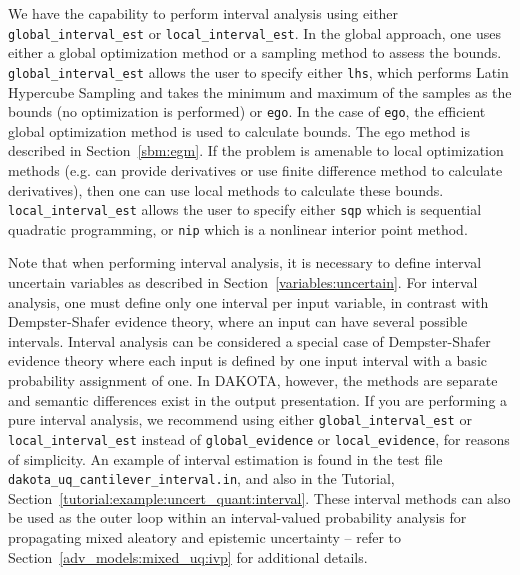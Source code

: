 We have the capability to perform interval analysis using either
\texttt{global\_interval\_est} or \texttt{local\_interval\_est}.
In the global approach, one uses either a global optimization 
method or a sampling method to assess the bounds. 
\texttt{global\_interval\_est}
allows the user to specify either \texttt{lhs}, which performs 
Latin Hypercube Sampling and takes the minimum and maximum of 
the samples as the bounds (no optimization is 
performed) or \texttt{ego}.  In the case of \texttt{ego}, 
the efficient global optimization method is used to calculate 
bounds.  The ego method is described in Section~\ref{sbm:egm}.
If the problem is amenable to local optimization 
methods (e.g. can provide derivatives or use finite difference 
method to calculate derivatives), then one can use local
methods to calculate these bounds.  \texttt{local\_interval\_est}
allows the user to specify either \texttt{sqp} which is sequential 
quadratic programming, or \texttt{nip} which is a nonlinear interior point 
method. 

Note that when performing interval analysis, it is necessary to define
interval uncertain variables as described in
Section~\ref{variables:uncertain}.  For interval analysis, one must
define only one interval per input variable, in contrast with
Dempster-Shafer evidence theory, where an input can have several
possible intervals.  Interval analysis can be considered a special
case of Dempster-Shafer evidence theory where each input is defined by
one input interval with a basic probability assignment of one.  In
DAKOTA, however, the methods are separate and semantic differences
exist in the output presentation.  If you are performing a pure
interval analysis, we recommend using either
\texttt{global\_interval\_est} or \texttt{local\_interval\_est}
instead of \texttt{global\_evidence} or \texttt{local\_evidence}, for
reasons of simplicity.  An example of interval estimation is found in
the test file \texttt{dakota\_uq\_cantilever\_interval.in}, and also
in the Tutorial, Section~\ref{tutorial:example:uncert_quant:interval}.
These interval methods can also be used as the outer loop within an
interval-valued probability analysis for propagating mixed aleatory
and epistemic uncertainty -- refer to
Section~\ref{adv_models:mixed_uq:ivp} for additional details.

